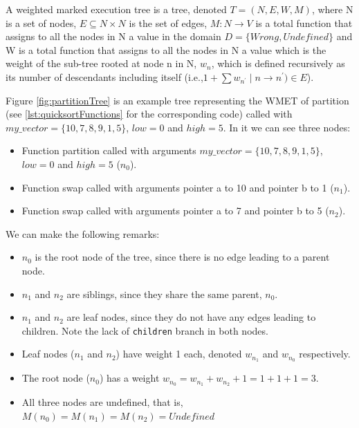 \begin{definition}
A weighted marked execution tree is a tree, denoted \(T=(N,E,W,M)\), where N is a set of nodes, \(E\subseteq N \times N\) is the set of edges, \(M:N\to V\) is a total function that assigns to all the nodes in N a value in the domain \(D=\{\mathit{Wrong},\mathit{Undefined}\}\) and W is a total function that assigns to all the nodes in N a value which is the weight of the sub-tree rooted at node n in N, \(w_n\), which is defined recursively as its number of descendants including itself (i.e.,\(1 + \sum {w_{n^\prime}\mid n \to n^{\prime}) \in E}\)).
\theoremstyle{definition}
\begin{exmp}
Figure \ref{fig:partitionTree} is an example tree representing the  WMET of partition (see \ref{lst:quicksortFunctions} for the corresponding code) called with \(my\_vector = \{10, 7, 8, 9, 1, 5\}\), \(low = 0\) and \(high = 5\). In it we can see three nodes:
\begin{itemize}
    \item Function partition called with arguments \(my\_vector = \{10, 7, 8, 9, 1, 5\}\), \(low = 0\) and \(high = 5\) (\(n_0\)).
    \item Function swap called with arguments pointer a to 10 and pointer b to 1 (\(n_1\)).
    \item Function swap called with arguments pointer a to 7 and pointer b to 5 (\(n_2\)).
\end{itemize}
We can make the following remarks:
\begin{itemize}
    \item \(n_0\) is the root node of the tree, since there is no edge leading to a parent node.
    \item \(n_1\) and \(n_2\) are siblings, since they share the same parent, \(n_0\).
    \item \(n_1\) and \(n_2\) are leaf nodes, since they do not have any edges leading to children. Note the lack of \verb|children| branch in both nodes.
    \item Leaf nodes (\(n_1\) and \(n_2\)) have weight 1 each, denoted \(w_{n_1}\) and \(w_{n_0}\) respectively.
    \item The root node (\(n_0\)) has a weight \(w_{n_0} = w_{n_1} + w_{n_2} + 1 = 1 + 1 + 1 = 3\).  
    \item All three nodes are undefined, that is, \(M(n_0) = M(n_1) = M(n_2) = \mathit{Undefined}\)
\end{itemize}

\begin{figure}[ht]

\begin{verbatim}

\end{verbatim}
\end{figure}
\end{exmp}
\end{definition}

